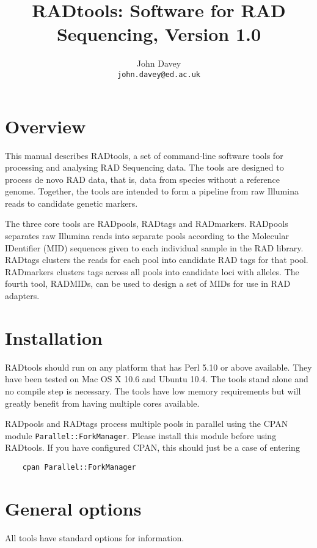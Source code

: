 \documentclass[a4paper]{article}
\title{RADtools: Software for RAD Sequencing, Version 1.0}
\author{John Davey\\{\tt john.davey@ed.ac.uk}}
\begin{document}
\maketitle

\section{Overview}

This manual describes RADtools, a set of command-line software tools for processing and analysing RAD Sequencing data. The tools are designed to process de novo RAD data, that is, data from species without a reference genome. Together, the tools are intended to form a pipeline from raw Illumina reads to candidate genetic markers.

The three core tools are RADpools, RADtags and RADmarkers. RADpools separates raw Illumina reads into separate pools according to the Molecular IDentifier (MID) sequences given to each individual sample in the RAD library. RADtags clusters the reads for each pool into candidate RAD tags for that pool. RADmarkers clusters tags across all pools into candidate loci with alleles. The fourth tool, RADMIDs, can be used to design a set of MIDs for use in RAD adapters.


\section{Installation}

RADtools should run on any platform that has Perl 5.10 or above available. They have been tested on Mac OS X 10.6 and Ubuntu 10.4. The tools stand alone and no compile step is necessary. The tools have low memory requirements but will greatly benefit from having multiple cores available.

RADpools and RADtags process multiple pools in parallel using the CPAN module \verb|Parallel::ForkManager|. Please install this module before using RADtools. If you have configured CPAN, this should just be a case of entering

\begin{verbatim}
    cpan Parallel::ForkManager
\end{verbatim}

\section{General options}

All tools have standard options for information.
\end{document}
